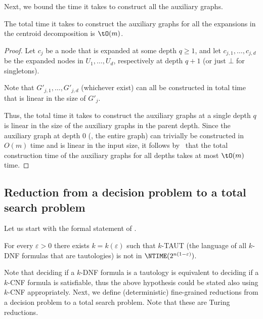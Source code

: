 Next, we bound the time it takes to construct all the auxiliary graphs.
\begin{lemma}\label{lemma:construction_time}
The total time it takes to construct the auxiliary graphs for all the expansions in the centroid decomposition is $\tO(m)$.
\end{lemma}

\begin{proof}
Let $c_j$ be a node that is expanded at some depth $q\geq 1$, and let $c_{j,1},\dots,c_{j,d}$ be the expanded nodes in $U_{1},\dots,U_{d}$, respectively at depth $q+1$ (or just $\bot$ for singletons).

Note that $G'_{j,1},\dots,G'_{j,d}$ (whichever exist) can all be constructed in total time that is linear in the size of $G'_j$.

Thus, the total time it takes to construct the auxiliary graphs at a single depth $q$ is linear in the size of the auxiliary graphs in the parent depth. Since the auxiliary graph at depth $0$ (\ie, the entire graph) can trivially be constructed in $O(m)$ time and is linear in the input size, it follows by~ that the total construction time of the auxiliary graphs for all depths takes at most $\tO(m)$ time.
\end{proof}

\subsection{Reduction from a decision problem to a total search problem}\label{subsec:reduction}

Let us start with the formal statement of \NSETH.
\begin{hypothesis}
For every $\varepsilon>0$ there exists $k=k(\varepsilon)$ such that $k$-TAUT (the language of all $k$-DNF formulas that are tautologies) is not in $\NTIME(2^{n(1-\varepsilon)})$.
\end{hypothesis}
Note that deciding if a $k$-DNF formula is a tautology is equivalent to deciding if a $k$-CNF formula is satisfiable, thus the above hypothesis could be stated also using $k$-CNF appropriately.
Next, we define (deterministic) fine-grained reductions from a decision problem to a total search problem. Note that these are Turing reductions.

